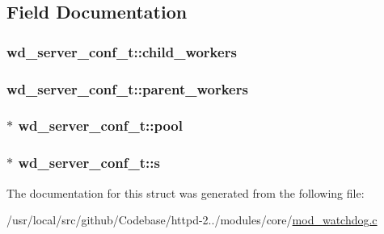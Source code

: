 \subsection{Field Documentation}
\subsubsection[{\texorpdfstring{child\+\_\+workers}{child_workers}}]{ wd\+\_\+server\+\_\+conf\+\_\+t\+::child\+\_\+workers}\hypertarget{structwd__server__conf__t_aaa9969ae538d8cb856e9b37c75f72844}{}\label{structwd__server__conf__t_aaa9969ae538d8cb856e9b37c75f72844}
\subsubsection[{\texorpdfstring{parent\+\_\+workers}{parent_workers}}]{ wd\+\_\+server\+\_\+conf\+\_\+t\+::parent\+\_\+workers}\hypertarget{structwd__server__conf__t_aa291bfde5561fc6412f9527368aea55d}{}\label{structwd__server__conf__t_aa291bfde5561fc6412f9527368aea55d}
\subsubsection[{\texorpdfstring{pool}{pool}}]{$\ast$ wd\+\_\+server\+\_\+conf\+\_\+t\+::pool}\hypertarget{structwd__server__conf__t_ac4d0e0358227bd9b422198ffa1b849f7}{}\label{structwd__server__conf__t_ac4d0e0358227bd9b422198ffa1b849f7}
\subsubsection[{\texorpdfstring{s}{s}}]{$\ast$ wd\+\_\+server\+\_\+conf\+\_\+t\+::s}\hypertarget{structwd__server__conf__t_aac947e3dc18bdc92d857644ac9e4517d}{}\label{structwd__server__conf__t_aac947e3dc18bdc92d857644ac9e4517d}


The documentation for this struct was generated from the following file\+:\begin{DoxyCompactItemize}
\item 
/usr/local/src/github/\+Codebase/httpd-\/2../modules/core/\hyperlink{mod__watchdog_8c}{mod\+\_\+watchdog.\+c}\end{DoxyCompactItemize}

